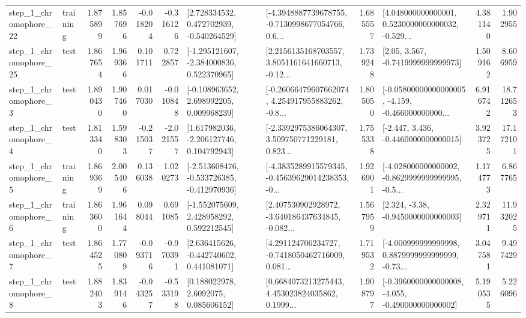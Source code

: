 \begin{tabular}{llrrrrllrlrr}
    step\_1\_chromophore\_22 &  training &      1.875899 &    1.857696 &     -0.018204 & -0.316126 &    [2.728334532, 0.472702939, -0.540264529] &  [-4.3948887739678755, -0.7130998677054766, 0.6... &       1.685557 &  [4.048000000000001, 0.5230000000000032, -0.529... &            4.381140 &          1.902955 \\
    step\_1\_chromophore\_25 &      test &      1.867654 &    1.969366 &      0.101711 &  0.722857 &   [-1.295121607, -2.384000836, 0.522370965] &  [2.2156135168703557, 3.8051161641660713, -0.12... &       1.739248 &                 [2.05, 3.567, -0.7419999999999973] &            1.509162 &          8.606959 \\
     step\_1\_chromophore\_3 &      test &      1.890430 &    1.907460 &      0.017030 & -0.010848 &    [-0.108963652, 2.698992205, 0.009968239] &  [-0.26066479607662074, 4.254917955883262, -0.8... &       1.805050 &  [-0.05800000000000005, -4.159, -0.466000000000... &            6.916742 &         18.712653 \\
     step\_1\_chromophore\_4 &      test &      1.813340 &    1.598303 &     -0.215037 & -2.021557 &    [1.617982036, -2.206127746, 0.104792943] &  [-2.3392975386064307, 3.509750771229181, 0.823... &       1.755338 &               [-2.447, 3.436, -0.4460000000000015] &            3.923725 &         17.172101 \\
     step\_1\_chromophore\_5 &  training &      1.869369 &    2.005406 &      0.136038 &  1.020273 &  [-2.513608476, -0.533726385, -0.412970936] &  [-4.3835289915579345, -0.45639629014238353, -0... &       1.926901 &  [-4.028000000000002, -0.8629999999999995, -0.5... &            1.174773 &          6.867765 \\
     step\_1\_chromophore\_6 &  training &      1.863600 &    1.961644 &      0.098044 &  0.691085 &    [-1.552075609, 2.428958292, 0.592212545] &  [2.407530902928972, -3.640186437634845, -0.082... &       1.567959 &                [2.324, -3.38, -0.9450000000000003] &            2.329711 &         11.932025 \\
     step\_1\_chromophore\_7 &      test &      1.864525 &    1.770809 &     -0.093716 & -0.970391 &    [2.636415626, -0.442740602, 0.441081071] &  [4.291124706234727, -0.7418050462716009, 0.081... &       1.719532 &  [-4.000999999999998, 0.8879999999999999, -0.73... &            3.047581 &          9.497429 \\
     step\_1\_chromophore\_8 &      test &      1.882403 &    1.839146 &     -0.043257 & -0.533198 &       [0.188022978, 2.6092075, 0.085606152] &  [0.6684073213275443, 4.453023824035862, 0.1999... &       1.908797 &  [-0.3960000000000008, -4.055, -0.490000000000002] &            5.190535 &          5.226096 \\

\end{tabular}
